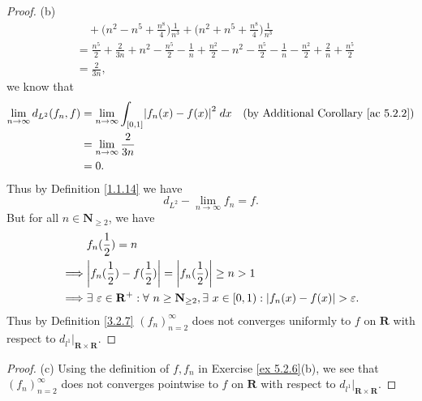 \begin{proof}{(b)}
\begin{align*}
         & \quad + \bigg(n^2 - n^5 + \frac{n^8}{4}\bigg) \frac{1}{n^3} + \bigg(n^2 + n^5 + \frac{n^8}{4}\bigg) \frac{1}{n^3}                                                                                                                                                                                 \\
         & = \frac{n^5}{2} + \frac{2}{3n} + n^2 - \frac{n^5}{2} - \frac{1}{n} + \frac{n^2}{2} - n^2 - \frac{n^5}{2} - \frac{1}{n} - \frac{n^2}{2} + \frac{2}{n} + \frac{n^5}{2}                                                                                                                              \\
         & = \frac{2}{3n},
    \end{align*}
    we know that
    \begin{align*}
        \lim_{n \to \infty} d_{L^2}(f_n, f) & = \lim_{n \to \infty} \int_{[0, 1]} \abs*{f_n(x) - f(x)}^2 \; dx & \text{(by Additional Corollary \ref{ac 5.2.2})} \\
                                            & = \lim_{n \to \infty} \frac{2}{3n}                                                                                 \\
                                            & = 0.
    \end{align*}
    Thus by Definition \ref{1.1.14} we have
    \[
        d_{L^2} - \lim_{n \to \infty} f_n = f.
    \]
    But for all \(n \in \mathbf{N}_{\geq 2}\), we have
    \begin{align*}
                 & f_n(\frac{1}{2}) = n                                                                                                                     \\
        \implies & \abs*{f_n(\frac{1}{2}) - f(\frac{1}{2})} = \abs*{f_n(\frac{1}{2})} \geq n > 1                                                            \\
        \implies & \exists\ \varepsilon \in \mathbf{R}^+ : \forall\ n \geq \mathbf{N}_{\geq 2}, \exists\ x \in [0, 1) : \abs*{f_n(x) - f(x)} > \varepsilon.
    \end{align*}
    Thus by Definition \ref{3.2.7} \((f_n)_{n = 2}^\infty\) does not converges uniformly to \(f\) on \(\mathbf{R}\) with respect to \(d_{l^1}|_{\mathbf{R} \times \mathbf{R}}\).
\end{proof}

\begin{proof}{(c)}
    Using the definition of \(f, f_n\) in Exercise \ref{ex 5.2.6}(b), we see that \((f_n)_{n = 2}^\infty\) does not converges pointwise to \(f\) on \(\mathbf{R}\) with respect to \(d_{l^1}|_{\mathbf{R} \times \mathbf{R}}\).
\end{proof}

